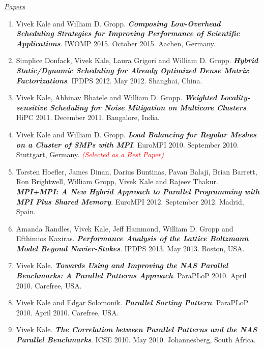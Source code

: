 




\underline{\textit{Papers}}
\begin{enumerate} 
\item Vivek Kale and William D. Gropp. \textbf{\textit{Composing Low-Overhead Scheduling Strategies for Improving Performance of Scientific Applications}}. IWOMP 2015. October 2015. Aachen, Germany.
\item Simplice Donfack, Vivek Kale, Laura Grigori and William D. Gropp. \textbf{\textit{Hybrid Static/Dynamic Scheduling for Already Optimized Dense Matrix Factorizations}}. IPDPS 2012. May 2012. Shanghai, China.
\item Vivek Kale, Abhinav Bhatele and William D. Gropp. \textbf{\textit{Weighted Locality-sensitive Scheduling for
      Noise Mitigation on Multicore Clusters}}. HiPC 2011. December
  2011. Bangalore, India. 
\item Vivek Kale and William D. Gropp. \textbf{\textit{Load Balancing for Regular Meshes on a Cluster of SMPs with MPI}}. EuroMPI 2010. September 2010. Stuttgart, Germany. \textit{\textcolor{red}{(Selected as a Best Paper)}}
\item Torsten Hoefler, James Dinan, Darius Buntinas, Pavan Balaji, Brian Barrett, Ron Brightwell, William Gropp, Vivek Kale and Rajeev Thakur. \textbf{\textit{MPI+MPI: A New Hybrid Approach to Parallel Programming with MPI Plus Shared Memory}}. EuroMPI 2012. September 2012. Madrid, Spain.
\item Amanda Randles, Vivek Kale, Jeff Hammond, William D. Gropp and Efthimios Kaxiras. \textbf{\textit{Performance Analysis of the Lattice
Boltzmann Model Beyond Navier-Stokes}}. IPDPS 2013. May 2013. Boston, USA.
\item Vivek Kale. \textbf{\textit{Towards Using and Improving the NAS Parallel Benchmarks: A Parallel Patterns Approach}}. ParaPLoP 2010. April 2010. Carefree, USA.
\item Vivek Kale and Edgar Solomonik. \textbf{\textit{Parallel Sorting Pattern}}. ParaPLoP 2010. April 2010. Carefree, USA. 
\item Vivek Kale. \textbf{\textit{The Correlation between Parallel Patterns and the NAS Parallel Benchmarks}}. ICSE 2010. May 2010. Johannesberg, South Africa.
\end{enumerate} 

